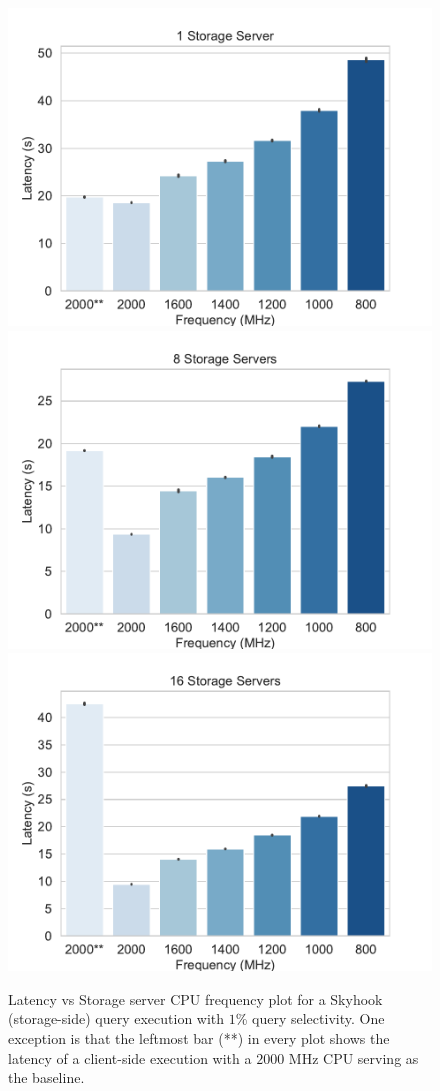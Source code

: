 \documentclass[11pt]{article}
\begin{document}
\begin{figure}[htp]

\centering
\includegraphics[width=.63\textwidth]{figs/plot_1.pdf}\hfill
\includegraphics[width=.63\textwidth]{figs/plot_8.pdf}\hfill
\includegraphics[width=.63\textwidth]{figs/plot_16.pdf}

\caption{Latency vs Storage server CPU frequency plot for a Skyhook (storage-side) query execution with $1$\% query selectivity. One exception is that the leftmost bar (**) in every plot shows the latency of a client-side execution with a $2000$ MHz CPU serving as the baseline.}
\label{fig:cpu}

\end{figure}
\end{document}
